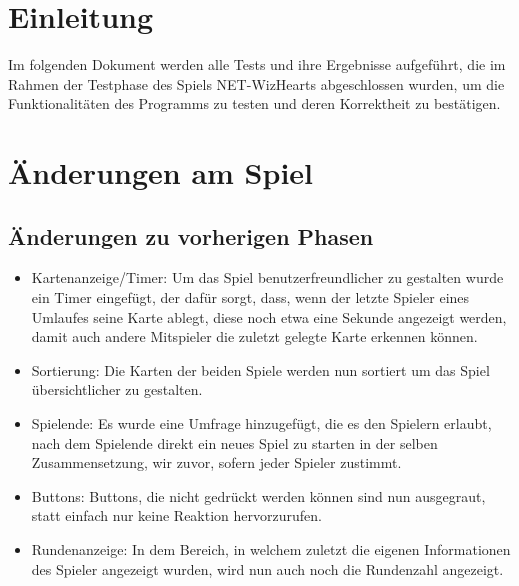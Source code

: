 \documentclass[a4paper]{article}
\begin{document}
\newpage
 
\section{Einleitung}
Im folgenden Dokument werden alle Tests und ihre Ergebnisse aufgeführt, die im Rahmen der Testphase des Spiels NET-WizHearts abgeschlossen wurden, um die Funktionalitäten des Programms zu testen und deren Korrektheit zu bestätigen.

\section{Änderungen am Spiel}
\subsection{Änderungen zu vorherigen Phasen}
	\begin{itemize}
	\item{Kartenanzeige/Timer:} Um das Spiel benutzerfreundlicher zu gestalten wurde ein Timer eingefügt, der dafür sorgt, 		dass, wenn der letzte Spieler eines Umlaufes seine Karte ablegt, diese noch etwa eine Sekunde angezeigt werden, damit 		auch andere Mitspieler die zuletzt gelegte Karte erkennen können. 
	\item{Sortierung:} Die Karten der beiden Spiele werden nun sortiert um das Spiel übersichtlicher zu gestalten.
	\item{Spielende:} Es wurde eine Umfrage hinzugefügt, die es den Spielern erlaubt, nach dem Spielende direkt ein neues 		Spiel zu starten in der selben Zusammensetzung, wir zuvor, sofern jeder Spieler zustimmt.
	\item{Buttons:} Buttons, die nicht gedrückt werden können sind nun ausgegraut, statt einfach nur keine Reaktion 			hervorzurufen.
	\item{Rundenanzeige:} In dem Bereich, in welchem zuletzt die eigenen Informationen des Spieler angezeigt wurden, wird 		nun auch noch die Rundenzahl angezeigt.
	\end{itemize}
	
\end{document}
